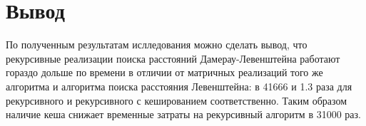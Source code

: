 \begin{center}
	\label{img:graph_sorted2}
\end{center}
\newpage

\section{Вывод}
По полученным результатам ислледования можно сделать вывод, что рекурсивные реализации поиска расстояний Дамерау-Левенштейна работают гораздо дольше по времени в отличии от матричных реализаций того же алгоритма и алгоритма поиска расстояния Левенштейна: в 41666 и 1.3 раза для рекурсивного и рекурсивного с кешированием соответственно. Таким образом наличие кеша снижает временные затраты на рекурсивный алгоритм в 31000 раз. 
